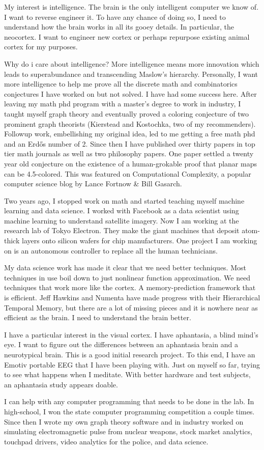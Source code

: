 \documentclass{article}
\begin{document}
My interest is intelligence. The brain is the only intelligent computer we know of. I want to reverse engineer it. To have any chance of doing so, I need to understand how the brain works in all its gooey details. In particular, the neocortex. I want to engineer new cortex or perhaps repurpose existing animal cortex for my purposes. 

Why do i care about intelligence? More intelligence means more innovation which leads to superabundance and transcending Maslow's hierarchy. Personally, I want more intelligence to help me prove all the discrete math and combinatorics conjectures I have worked on but not solved. I have had some success here. After leaving my math phd program with a master's degree to work in industry, I taught myself graph theory and eventually proved a coloring conjecture of two prominent graph theorists (Kierstead and Kostochka, two of my recommenders). Followup work, embellishing my original idea, led to me getting a free math phd and an Erdős number of 2.  Since then I have published over thirty papers in top tier math journals as well as two philosophy papers. One paper settled a twenty year old conjecture on the existence of a human-grokable proof that planar maps can be 4.5-colored. This was featured on Computational Complexity, a popular computer science blog by Lance Fortnow \& Bill Gasarch.

Two years ago, I stopped work on math and started teaching myself machine learning and data science. I worked with Facebook as a data scientist using machine learning to understand satellite imagery. Now I am working at the research lab of Tokyo Electron. They make the giant machines that deposit atom-thick layers onto silicon wafers for chip manufacturers. One project I am working on is an autonomous controller to replace all the human technicians. 

My data science work has made it clear that we need better techniques. Most techniques in use boil down to just nonlinear function approximation. We need techniques that work more like the cortex. A memory-prediction framework that is efficient. Jeff Hawkins and Numenta have made progress with their Hierarchical Temporal Memory, but there are a lot of missing pieces and it is nowhere near as efficient as the brain. I need to understand the brain better. 

I have a particular interest in the visual cortex. I have aphantasia, a blind mind's eye. I want to figure out the differences between an aphantasia brain and a neurotypical brain. This is a good initial research project. To this end, I have an Emotiv portable EEG that I have been playing with. Just on myself so far, trying to see what happens when I meditate. With better hardware and test subjects, an aphantasia study appears doable.

I can help with any computer programming that needs to be done in the lab. In high-school, I won the state computer programming competition a couple times. Since then I wrote my own graph theory software and in industry worked on simulating electromagnetic pulse from nuclear weapons, stock market analytics, touchpad drivers, video analytics for the police, and data science. 
\end{document}
